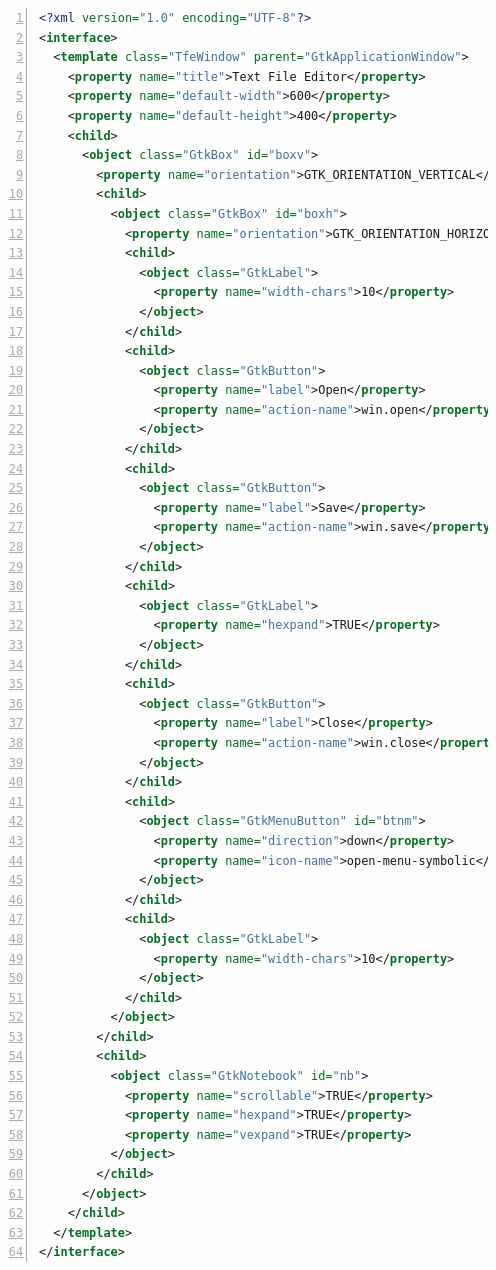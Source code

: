 \begin{lstlisting}[language=XML, numbers=left]
<?xml version="1.0" encoding="UTF-8"?>
<interface>
  <template class="TfeWindow" parent="GtkApplicationWindow">
    <property name="title">Text File Editor</property>
    <property name="default-width">600</property>
    <property name="default-height">400</property>
    <child>
      <object class="GtkBox" id="boxv">
        <property name="orientation">GTK_ORIENTATION_VERTICAL</property>
        <child>
          <object class="GtkBox" id="boxh">
            <property name="orientation">GTK_ORIENTATION_HORIZONTAL</property>
            <child>
              <object class="GtkLabel">
                <property name="width-chars">10</property>
              </object>
            </child>
            <child>
              <object class="GtkButton">
                <property name="label">Open</property>
                <property name="action-name">win.open</property>
              </object>
            </child>
            <child>
              <object class="GtkButton">
                <property name="label">Save</property>
                <property name="action-name">win.save</property>
              </object>
            </child>
            <child>
              <object class="GtkLabel">
                <property name="hexpand">TRUE</property>
              </object>
            </child>
            <child>
              <object class="GtkButton">
                <property name="label">Close</property>
                <property name="action-name">win.close</property>
              </object>
            </child>
            <child>
              <object class="GtkMenuButton" id="btnm">
                <property name="direction">down</property>
                <property name="icon-name">open-menu-symbolic</property>
              </object>
            </child>
            <child>
              <object class="GtkLabel">
                <property name="width-chars">10</property>
              </object>
            </child>
          </object>
        </child>
        <child>
          <object class="GtkNotebook" id="nb">
            <property name="scrollable">TRUE</property>
            <property name="hexpand">TRUE</property>
            <property name="vexpand">TRUE</property>
          </object>
        </child>
      </object>
    </child>
  </template>
</interface>
\end{lstlisting}

